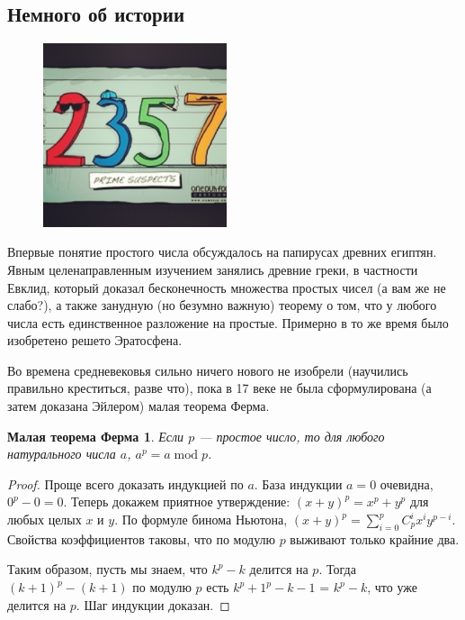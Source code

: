 \documentclass[12pt]{article}
\newtheorem*{mfermat}{Малая теорема Ферма}
\begin{document}
\subsection*{Немного об истории}
\begin{figure}
  \begin{center}
    \includegraphics[width=0.48\textwidth]{primejoke.jpg}
  \end{center}
\end{figure}
Впервые понятие простого числа обсуждалось на папирусах древних египтян. Явным целенаправленным изучением занялись древние греки, в частности Евклид, который доказал бесконечность множества простых чисел (а вам же не слабо?), а также занудную (но безумно важную) теорему о том, что у любого числа есть единственное разложение на простые. Примерно в то же время было изобретено решето Эратосфена.

Во времена средневековья сильно ничего нового не изобрели (научились правильно креститься, разве что), пока в 17 веке не была сформулирована (а затем доказана Эйлером) малая теорема Ферма.

\begin{mfermat}
Если $p$ --- простое число, то для любого натурального числа $a$, $a^p = a\;\mbox{mod}\;p$.
\end{mfermat}

\begin{proof}
Проще всего доказать индукцией по $a$. База индукции $a = 0$ очевидна, $0^p - 0 = 0$. Теперь докажем приятное утверждение: $(x + y)^p = x^p + y^p$ для любых целых $x$ и $y$. По формуле бинома Ньютона, $(x + y)^p = \sum\limits_{i = 0}^p C^{i}_p x^i y^{p - i}$. Свойства коэффициентов таковы, что по модулю $p$ выживают только крайние два.

Таким образом, пусть мы знаем, что $k^p - k$ делится на $p$. Тогда $(k + 1)^p - (k + 1)$ по модулю $p$ есть $k^p + 1^p - k - 1$ = $k^p - k$, что уже делится на $p$. Шаг индукции доказан.
\end{proof}
\end{document}
